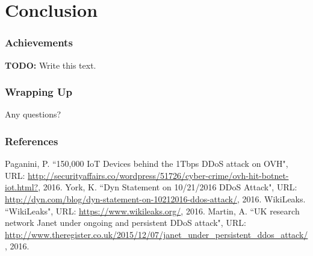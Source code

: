 \documentclass[10pt]{beamer}
\begin{document}
  \section[End]{Conclusion}
  \begin{frame}
    \frametitle{Achievements}
    \textbf{TODO:} Write this text.
  \end{frame}
  \begin{frame}
    \frametitle{Wrapping Up}
    \begin{block}{}
      \centering
      Any questions?
    \end{block}
  \end{frame}
  \begin{frame}
    \frametitle{References}
    \begin{thebibliography}{}
        Paganini, P.
        ``150,000 IoT Devices behind the 1Tbps DDoS attack on OVH",
        URL: \url{http://securityaffairs.co/wordpress/51726/cyber-crime/ovh-hit-botnet-iot.html?},
        2016.
        York, K.
        ``Dyn Statement on 10/21/2016 DDoS Attack",
        URL: \url{http://dyn.com/blog/dyn-statement-on-10212016-ddos-attack/},
        2016.
        WikiLeaks.
        ``WikiLeaks",
        URL: \url{https://www.wikileaks.org/},
        2016.
        Martin, A.
        ``UK research network Janet under ongoing and persistent DDoS attack",
        URL: \url{http://www.theregister.co.uk/2015/12/07/janet_under_persistent_ddos_attack/},
        2016.
    \end{thebibliography}
  \end{frame}
\end{document}
